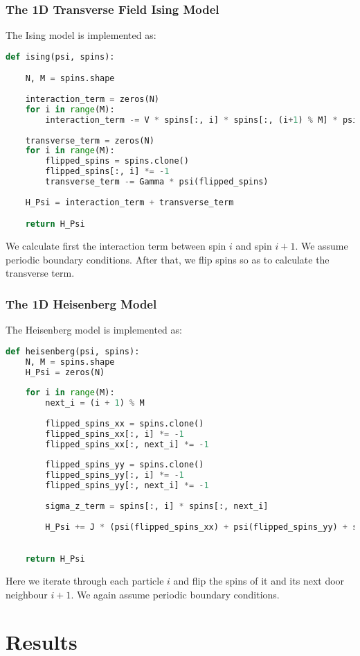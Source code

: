 \documentclass[12pt]{article}
\begin{document}
{\section{The 1D Transverse Field Ising Model}
The Ising model is implemented as:
\begin{lstlisting}[language=Python]
def ising(psi, spins):

    N, M = spins.shape
    
    interaction_term = zeros(N)
    for i in range(M):
        interaction_term -= V * spins[:, i] * spins[:, (i+1) % M] * psi(spins)
    
    transverse_term = zeros(N)
    for i in range(M):
        flipped_spins = spins.clone()
        flipped_spins[:, i] *= -1
        transverse_term -= Gamma * psi(flipped_spins)
    
    H_Psi = interaction_term + transverse_term

    return H_Psi
\end{lstlisting}
We calculate first the interaction term between spin $i$ and spin $i+1$. We assume periodic boundary conditions. After that, we flip spins so as to calculate the transverse term.
\section{The 1D Heisenberg Model}
The Heisenberg model is implemented as:
\begin{lstlisting}[language=Python]
def heisenberg(psi, spins):
    N, M = spins.shape
    H_Psi = zeros(N)
    
    for i in range(M):
        next_i = (i + 1) % M
        
        flipped_spins_xx = spins.clone()
        flipped_spins_xx[:, i] *= -1
        flipped_spins_xx[:, next_i] *= -1
        
        flipped_spins_yy = spins.clone()
        flipped_spins_yy[:, i] *= -1
        flipped_spins_yy[:, next_i] *= -1
        
        sigma_z_term = spins[:, i] * spins[:, next_i]
        
        H_Psi += J * (psi(flipped_spins_xx) + psi(flipped_spins_yy) + sigma_z_term * psi(spins))

    
    return H_Psi
\end{lstlisting}
Here we iterate through each particle $i$ and flip the spins of it and its next door neighbour $i+1$. We again assume periodic boundary conditions.
\newpage
~\newpage
\part{Results}
}
\end{document}
